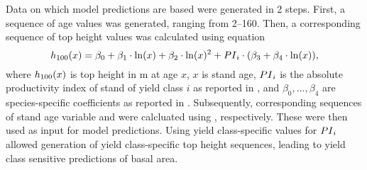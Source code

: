 Data on which model predictions are based were generated in 2 steps. First, a sequence of age values was generated, ranging from \SIrange{2}{160}{\year}.  Then, a corresponding sequence of top height values was calculated using equation
\begin{equation}
  \label{eq:NagelFunctionSolvedForTopHeight}
  h_{100}{}(x) = \beta_0 + \beta_1 \cdot \ln(x) + \beta_2 \cdot \ln(x)^2 + PI{}_i \cdot (\beta_3 + \beta_4 \cdot \ln(x)),
\end{equation}
where \(h_{100}{}(x)\) is top height in \si{\meter} at age \(x\), \(x\) is stand age, \(PI{}_i\) is the absolute productivity index of stand of yield class \(i\) as reported in , and \(\beta_0, \ldots, \beta_4\) are species-specific coefficients as reported in  \parencite{Nagel1999}.  Subsequently, corresponding sequences of stand age variable and \ProductivityIndexVariableText{} were calcluated using , respectively.  These were then used as input for model predictions.  Using yield class-specific values for \(PI{}_i\) allowed generation of yield class-specific top height sequences, leading to yield class sensitive predictions of basal area.  

